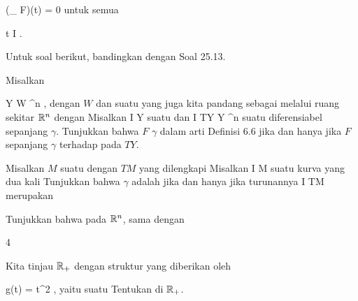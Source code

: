 \mavergleichskettedisp
{\vergleichskette
{ (\nabla_{\partial} F)(t)
}
{ =} { 0
}
{ } {
}
{ } {
}
{ } {
}
}
{}{}{}
untuk semua

\mavergleichskette
{\vergleichskette
{ t
}
{ \in }{ I
}
{  }{
}
{    }{
}
{   }{
}
}
{}{}{.}

Untuk soal berikut, bandingkan dengan
Soal 25.13.

{}
{

Misalkan

\mavergleichskette
{\vergleichskette
{ Y
}
{ \subseteq }{ W
}
{ \subseteq }{ \R^n
}
{    }{
}
{   }{
}
}
{}{}{,}
dengan $W$
dan suatu
yang juga kita pandang sebagai
melalui ruang sekitar ${\mathbb R}^n$ dengan
Misalkan
\maabb {\gamma} { I } { Y
} {}
suatu
dan
 { I } { TY \subseteq Y \times \R^n
} {}
suatu
diferensiabel sepanjang $\gamma$. Tunjukkan bahwa $F$
$\gamma$ dalam arti
Definisi 6.6
jika dan hanya jika $F$
sepanjang $\gamma$ terhadap
pada $TY$.

}
{} {}

{}
{

Misalkan $M$ suatu
dengan
$TM$ yang dilengkapi
Misalkan
\maabb {\gamma} { I } { M
} {}
suatu kurva yang dua kali
Tunjukkan bahwa $\gamma$ adalah
jika dan hanya jika turunannya
 { I } { TM
} {}
merupakan

}
{} {}

{}
{

Tunjukkan bahwa pada
${\mathbb R}^n$,
sama dengan

}
{} {}


{4}
{

Kita tinjau ${\mathbb R}_+$ dengan struktur yang diberikan oleh

\mavergleichskette
{\vergleichskette
{ g(t)
}
{ = }{ t^2
}
{  }{
}
{    }{
}
{   }{
}
}
{}{}{,}
yaitu suatu
Tentukan
di ${\mathbb R}_+$.

}
{} {}

